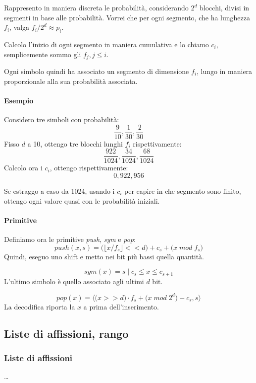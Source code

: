 Rappresento in maniera discreta le probabilità, considerando $2^d$ blocchi, divisi in segmenti in base alle probabilità. 
Vorrei che per ogni segmento, che ha lunghezza $f_i$, valga $f_i/2^d \approx p_i$.

Calcolo l'inizio di ogni segmento in maniera cumulativa e lo chiamo $c_i$, semplicemente sommo gli $f_j, j \leq i$.

Ogni simbolo quindi ha associato un segmento di dimensione $f_i$, lungo 
in maniera proporzionale alla sua probabilità associata.

\paragraph{Esempio}
Considero tre simboli con probabilità: $$\frac{9}{10}, \frac{1}{30}, \frac{2}{30}$$
Fisso $d$ a 10, ottengo tre blocchi lunghi $f_i$ rispettivamente: 
$$\frac{922}{1024}, \frac{34}{1024}, \frac{68}{1024}$$
Calcolo ora i $c_i$, ottengo rispettivamente: 
$$0, 922, 956$$
\begin{remark}
    Se estraggo a caso da 1024, usando i $c_i$ per capire in che segmento sono finito, 
    ottengo ogni valore quasi con le probabilità iniziali. 
\end{remark}

\paragraph{Primitive}
Definiamo ora le primitive \emph{push}, \emph{sym} e \emph{pop}:
$$\mathit{push}(x, s) = \big( \big\lfloor x/ f_s \big\rfloor << d \big)
+ c_s + \big( x\;\textit{mod}\;f_s \big)$$
Quindi, eseguo uno shift e metto nei bit più bassi quella quantità.

$$\mathit{sym}(x) = s\; | \; c_s \leq x \leq c_{s+1}$$
L'ultimo simbolo è quello associato agli ultimi $d$ bit. 

$$\mathit{pop}(x) = \langle \big(x >> d\big) \cdot f_s + \big( x\;\textit{mod}\;2^d \big) - c_s, s \rangle$$
La decodifica riporta la $x$ a prima dell'inserimento.

\subsection{Liste di affissioni, rango}
\subsubsection{Liste di affissioni}
\dots
